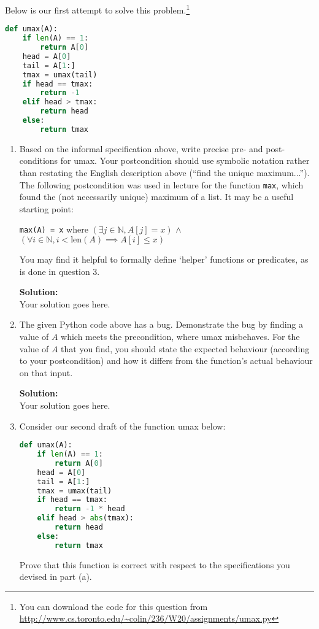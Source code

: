 \documentclass[boldsans]{article}
\newcommand{\N}{\mathbb{N}}
\newcommand{\AND}{\wedge}
\newenvironment{solution}
{\bigskip \noindent \textbf{Solution: \\}}
{}
\begin{document}
\begin{enumerate}
Below is our first attempt to solve this problem.\footnote{
You can download the code for this question from \url{http://www.cs.toronto.edu/~colin/236/W20/assignments/umax.py}
}

\begin{lstlisting}[language=Python]
def umax(A):
    if len(A) == 1:
        return A[0]
    head = A[0]
    tail = A[1:]
    tmax = umax(tail)
    if head == tmax:
        return -1
    elif head > tmax:
        return head
    else:
        return tmax
\end{lstlisting}

\begin{enumerate}
    \item Based on the informal specification above, write precise pre- and post-conditions for umax. Your postcondition should use symbolic notation rather than restating the English description above (``find the unique maximum...''). The following postcondition was used in lecture for the function \texttt{max}, which found the (not necessarily unique) maximum of a list. It may be a useful starting point:
    
    \medskip
    
    \texttt{max(A) = x} where $\left(\exists j \in \N, A[j] = x\right)$ $\AND$ $\left(\forall i \in \N, i < \mathrm{len}(A) \implies A[i] \leq x\right)$
    
    \medskip
    
    You may find it helpful to formally define `helper' functions or predicates, as is done in question 3.

\begin{solution}
Your solution goes here.
\end{solution}

\item The given Python code above has a bug. Demonstrate the bug by finding a value of $A$ which meets the precondition, where umax misbehaves. For the value of $A$ that you find, you should state the expected behaviour (according to your postcondition) and how it differs from the function's actual behaviour on that input.

\begin{solution}
Your solution goes here.
\end{solution}

\item Consider our second draft of the function umax below:
\begin{lstlisting}[language=Python]
def umax(A):
    if len(A) == 1:
        return A[0]
    head = A[0]
    tail = A[1:]
    tmax = umax(tail)
    if head == tmax:
        return -1 * head
    elif head > abs(tmax):
        return head
    else:
        return tmax
\end{lstlisting}
Prove that this function is correct with respect to the specifications you devised in part (a). 


\end{enumerate}
\end{enumerate}
\end{document}
